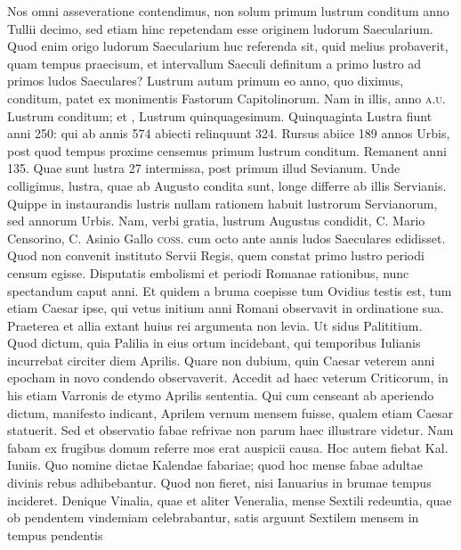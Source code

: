 Nos omni asseveratione
contendimus,
non solum primum
lustrum conditum
anno Tullii decimo,
sed etiam hinc
repetendam esse originem
ludorum Saecularium.
Quod enim
origo ludorum Saecularium
huc referenda
sit, quid melius probaverit,
quam tempus praecisum, et intervallum Saeculi definitum a
primo lustro ad primos ludos Saeculares?
%
Lustrum autum primum eo
anno, quo diximus, conditum, patet ex monimentis Fastorum Capitolinorum.
Nam in illis, anno \textsc{a.u.}  Lustrum 
 conditum;
et , Lustrum quinquagesimum.
Quinquaginta
Lustra fiunt anni 250: qui ab annis 574 abiecti relinquunt 324.
Rursus abiice 189 annos Urbis, post quod tempus proxime censemus
primum lustrum conditum.
Remanent anni 135.
Quae sunt lustra
27 intermissa, post primum illud Sevianum.
Unde colligimus,
lustra, quae ab Augusto condita sunt, longe differre ab illis Servianis.
Quippe in instaurandis lustris nullam rationem habuit lustrorum
Servianorum, sed annorum Urbis.
Nam, verbi gratia, lustrum
Augustus condidit, C. Mario Censorino, C. Asinio Gallo \textsc{coss.}
cum octo ante annis ludos Saeculares edidisset.
Quod non convenit
instituto
Servii Regis, quem constat primo lustro periodi censum
egisse.
Disputatis embolismi et periodi Romanae rationibus, nunc
spectandum caput anni.
Et quidem a bruma coepisse tum Ovidius
testis est, tum etiam Caesar ipse, qui vetus initium anni Romani
observavit in ordinatione sua.
Praeterea et allia extant huius rei argumenta
non levia.
Ut sidus Palititium.
Quod dictum, quia Palilia in
eius ortum incidebant, qui temporibus Iulianis incurrebat circiter
 diem Aprilis.
Quare non dubium, quin Caesar veterem anni
epocham in novo condendo observaverit.
Accedit ad haec veterum
Criticorum, in his etiam Varronis de etymo Aprilis sententia.
Qui
cum censeant ab aperiendo dictum, manifesto indicant, Aprilem
vernum mensem fuisse, qualem etiam Caesar statuerit.
Sed et observatio fabae
refrivae non parum haec illustrare videtur.
Nam fabam
ex frugibus domum referre mos erat auspicii causa.
Hoc autem fiebat
Kal. Iuniis. %
Quo nomine dictae Kalendae fabariae; quod hoc mense
fabae adultae divinis rebus adhibebantur.
Quod non fieret, nisi
Ianuarius in brumae tempus incideret.
Denique Vinalia, quae et aliter
Veneralia, mense Sextili redeuntia, quae ob pendentem vindemiam
celebrabantur, satis arguunt Sextilem mensem in tempus pendentis
